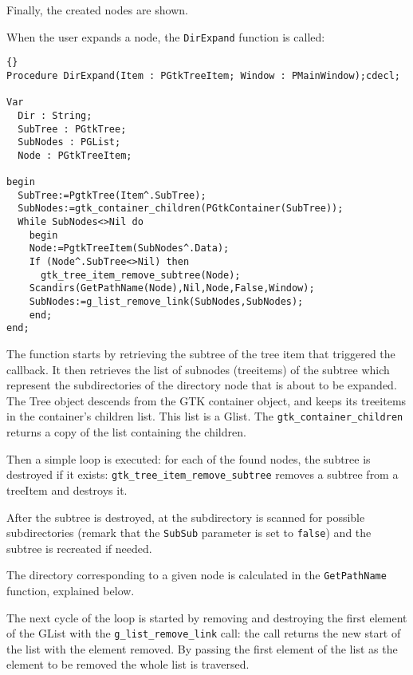 \documentclass[10pt]{article}
\begin{document}
Finally, the created nodes are shown.

When the user expands a node, the \lstinline|DirExpand| function is
called:
\begin{lstlisting}{}
Procedure DirExpand(Item : PGtkTreeItem; Window : PMainWindow);cdecl;
 
Var 
  Dir : String;
  SubTree : PGtkTree;
  SubNodes : PGList;
  Node : PGtkTreeItem;
   
begin
  SubTree:=PgtkTree(Item^.SubTree);
  SubNodes:=gtk_container_children(PGtkContainer(SubTree));
  While SubNodes<>Nil do
    begin
    Node:=PgtkTreeItem(SubNodes^.Data);
    If (Node^.SubTree<>Nil) then 
      gtk_tree_item_remove_subtree(Node);
    Scandirs(GetPathName(Node),Nil,Node,False,Window);
    SubNodes:=g_list_remove_link(SubNodes,SubNodes);
    end;
end;
\end{lstlisting}
The function starts by retrieving the subtree of the tree item that
triggered the callback. It then retrieves the list of subnodes (treeitems)
of the subtree which represent the subdirectories of the directory node 
that is about to be expanded. The Tree object descends from the GTK
container object, and keeps its treeitems in the container's children
list. This list is a Glist. The \lstinline|gtk_container_children| returns
a copy of the list containing the children.

Then a simple loop is executed: for each of
the found nodes, the subtree is destroyed if it exists:
\lstinline|gtk_tree_item_remove_subtree| removes a subtree from a treeItem
and destroys it. 

After the subtree is destroyed, at the subdirectory is scanned for possible
subdirectories (remark that the \lstinline|SubSub| parameter is set to 
\lstinline|false|) and the subtree is recreated if needed.

The directory corresponding to a given node is calculated in the 
\lstinline|GetPathName| function, explained below.

The next cycle of the loop is started by removing and destroying the first
element of the GList with the \lstinline|g_list_remove_link| call:
the call returns the new start of the list with the element removed. By
passing the first element of the list as the element to be removed the 
whole list is traversed.
\end{document}
